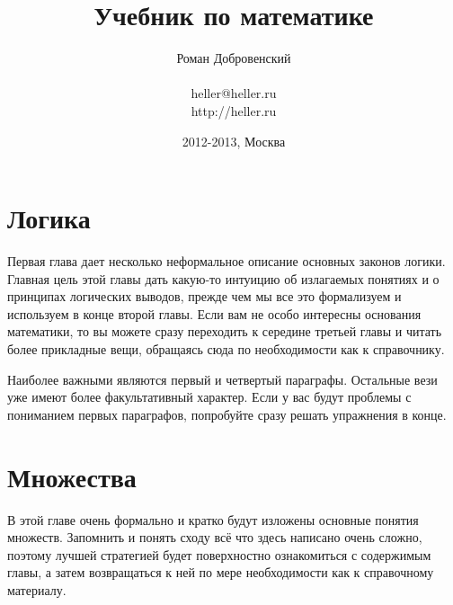 \documentclass[a5paper,10pt,pagesize,DIV=classic]{scrbook}
\begin{document}
\title{Учебник по математике}
\author{Роман Добровенский\\ \\heller@heller.ru\\http://heller.ru}
\date{2012-2013, Москва}
\maketitle

\tableofcontents



\chapter{Логика}
Первая глава дает несколько неформальное описание основных законов логики. Главная цель этой главы дать какую-то интуицию об излагаемых понятиях и о принципах логических выводов, прежде чем мы все это формализуем и используем в конце второй главы. Если вам не особо интересны основания математики, то вы можете сразу переходить к середине третьей главы и читать более прикладные вещи, обращаясь сюда по необходимости как к справочнику.

Наиболее важными являются первый и четвертый параграфы. Остальные вези уже имеют более факультативный характер. Если у вас будут проблемы с пониманием первых параграфов, попробуйте сразу решать упражнения в конце.











\chapter{Множества}
В этой главе очень формально и кратко будут изложены основные понятия множеств. Запомнить и понять сходу всё что здесь написано очень сложно, поэтому лучшей стратегией будет поверхностно ознакомиться с содержимым главы, а затем возвращаться к ней по мере необходимости как к справочному материалу.








\end{document}

